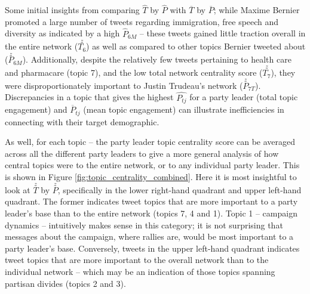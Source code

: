 Some initial insights from comparing \textbf{$\hat{T}$} by \textbf{$\hat{P}$}
with \textbf{$\overline{T}$} by \textbf{$\overline{P}$}; while Maxime Bernier
promoted a large number of tweets regarding immigration, free speech and
diversity as indicated by a high $\hat{P}_{6M}$ -- these tweets gained little
traction overall in the entire network ($\stackrel{z}{T_{6}}$) as well as
compared to other topics Bernier tweeted about ($\stackrel{z}{P}_{6M}$).
Additionally, despite the relatively few tweets pertaining to health care and
pharmacare (topic 7), and the low total network centrality score
($\stackrel{z}{T_{7}}$), they were disproportionately important to Justin
Trudeau's network ($\stackrel{z}{P}_{7T}$). Discrepancies in a topic that gives
the highest $\hat{P_{tj}}$ for a party leader (total topic engagement) and
$\overline{P}_{tj}$  (mean topic engagement) can illustrate inefficiencies in
connecting with their target demographic.

As well, for each topic -- the party leader topic centrality score can be
averaged across all the different party leaders to give a more general analysis
of how central topics were to the entire network, or to any individual party
leader. This is shown in Figure \ref{fig:topic_centrality_combined}. Here it is
most insightful to look at \textbf{$\stackrel{z}{T}$} by
\textbf{$\stackrel{z}{P}$}, specifically in the lower right-hand quadrant and
upper left-hand quadrant. The former indicates tweet topics that are more
important to a party leader's base than to the entire network (topics 7, 4 and
1). Topic 1 -- campaign dynamics -- intuitively makes sense in this category; it
is not surprising that messages about the campaign, where rallies are, \etc
would  be most important to a party leader's base. Conversely, tweets in the
upper left-hand quadrant indicates tweet topics that are more important to the
overall network than to the individual network -- which may be an indication of
those topics spanning partisan divides (topics 2 and 3).

